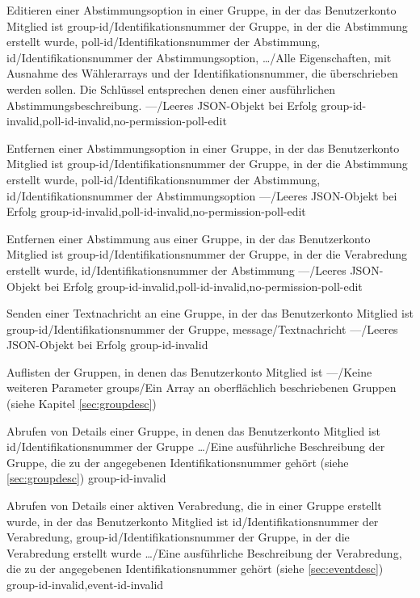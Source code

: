 \documentclass[parskip=full,11pt]{scrartcl}
\begin{document}
{Editieren einer Abstimmungsoption in einer Gruppe, in der das Benutzerkonto
Mitglied ist}
{group-id/Identifikationsnummer der Gruppe{,} in der die Abstimmung erstellt
wurde,
poll-id/Identifikationsnummer der Abstimmung,
id/Identifikationsnummer der Abstimmungsoption,
\dots/Alle Eigenschaften{,} mit Ausnahme des Wählerarrays und der
Identifikationsnummer{,} die überschrieben werden sollen.
Die Schlüssel entsprechen denen einer ausführlichen Abstimmungsbeschreibung.}
{---/Leeres JSON-Objekt bei Erfolg}
{group-id-invalid,poll-id-invalid,no-permission-poll-edit}

{Entfernen einer Abstimmungsoption in einer Gruppe, in der das Benutzerkonto
Mitglied ist}
{group-id/Identifikationsnummer der Gruppe{,} in der die Abstimmung erstellt
wurde,
poll-id/Identifikationsnummer der Abstimmung,
id/Identifikationsnummer der Abstimmungsoption}
{---/Leeres JSON-Objekt bei Erfolg}
{group-id-invalid,poll-id-invalid,no-permission-poll-edit}

{Entfernen einer Abstimmung aus einer Gruppe, in der das Benutzerkonto Mitglied
ist}
{group-id/Identifikationsnummer der Gruppe{,} in der die Verabredung erstellt
wurde,
id/Identifikationsnummer der Abstimmung}
{---/Leeres JSON-Objekt bei Erfolg}
{group-id-invalid,poll-id-invalid,no-permission-poll-edit}

{Senden einer Textnachricht an eine Gruppe, in der das Benutzerkonto Mitglied
ist}
{group-id/Identifikationsnummer der Gruppe,
message/Textnachricht} %
{---/Leeres JSON-Objekt bei Erfolg}
{group-id-invalid}

{Auflisten der Gruppen, in denen das Benutzerkonto Mitglied ist}
{---/Keine weiteren Parameter}
{groups/Ein Array an oberflächlich beschriebenen Gruppen (siehe
Kapitel \ref{sec:groupdesc})}
{}

{Abrufen von Details einer Gruppe, in denen das Benutzerkonto Mitglied ist}
{id/Identifikationsnummer der Gruppe}
{\dots/Eine ausführliche Beschreibung der Gruppe{,} die zu der angegebenen
Identifikationsnummer gehört (siehe \ref{sec:groupdesc})}
{group-id-invalid}

{Abrufen von Details einer aktiven Verabredung, die in einer Gruppe erstellt
wurde, in der das Benutzerkonto Mitglied ist}
{id/Identifikationsnummer der Verabredung,
group-id/Identifikationsnummer der Gruppe{,} in der die Verabredung erstellt
wurde}
{\dots/Eine ausführliche Beschreibung der Verabredung{,} die zu der angegebenen
Identifikationsnummer gehört (siehe \ref{sec:eventdesc})}
{group-id-invalid,event-id-invalid}
\end{document}
